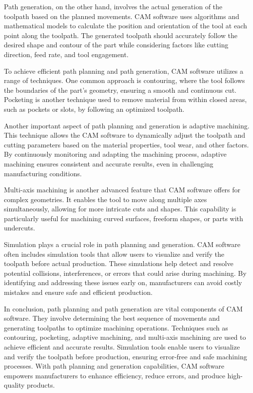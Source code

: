 Path generation, on the other hand, involves the actual generation of the toolpath based on the planned movements. CAM software uses algorithms and mathematical models to calculate the position and orientation of the tool at each point along the toolpath. The generated toolpath should accurately follow the desired shape and contour of the part while considering factors like cutting direction, feed rate, and tool engagement.

To achieve efficient path planning and path generation, CAM software utilizes a range of techniques. One common approach is contouring, where the tool follows the boundaries of the part's geometry, ensuring a smooth and continuous cut. Pocketing is another technique used to remove material from within closed areas, such as pockets or slots, by following an optimized toolpath.

Another important aspect of path planning and generation is adaptive machining. This technique allows the CAM software to dynamically adjust the toolpath and cutting parameters based on the material properties, tool wear, and other factors. By continuously monitoring and adapting the machining process, adaptive machining ensures consistent and accurate results, even in challenging manufacturing conditions.

Multi-axis machining is another advanced feature that CAM software offers for complex geometries. It enables the tool to move along multiple axes simultaneously, allowing for more intricate cuts and shapes. This capability is particularly useful for machining curved surfaces, freeform shapes, or parts with undercuts.

Simulation plays a crucial role in path planning and generation. CAM software often includes simulation tools that allow users to visualize and verify the toolpath before actual production. These simulations help detect and resolve potential collisions, interferences, or errors that could arise during machining. By identifying and addressing these issues early on, manufacturers can avoid costly mistakes and ensure safe and efficient production.

In conclusion, path planning and path generation are vital components of CAM software. They involve determining the best sequence of movements and generating toolpaths to optimize machining operations. Techniques such as contouring, pocketing, adaptive machining, and multi-axis machining are used to achieve efficient and accurate results. Simulation tools enable users to visualize and verify the toolpath before production, ensuring error-free and safe machining processes. With path planning and generation capabilities, CAM software empowers manufacturers to enhance efficiency, reduce errors, and produce high-quality products.

